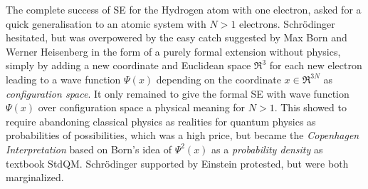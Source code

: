 \documentclass[11pt]{article} %
\begin{document}
The complete success of SE for the Hydrogen atom with one electron,  asked for a quick generalisation to an atomic system with $N>1$ electrons.  Schr\"odinger hesitated,  but was overpowered by the easy catch suggested by Max Born and Werner Heisenberg in the form of a purely formal extension without physics,  simply by adding a new coordinate and Euclidean space $\Re^3$ for each new electron leading to a wave function $\Psi (x)$ depending on the coordinate $x\in\Re^{3N}$ as \emph{configuration space}.  It only remained to give the formal SE with wave function $\Psi (x)$ over configuration space a physical meaning for $N>1$.  This showed to require abandoning classical physics as realities for quantum physics as probabilities of possibilities,  which was a high price,  but became the \emph{Copenhagen Interpretation} based on Born's idea of $\Psi^2(x)$ as a \emph{probability density} as textbook StdQM.  Schr\"odinger supported by Einstein protested,  but were both marginalized. 


\end{document}

